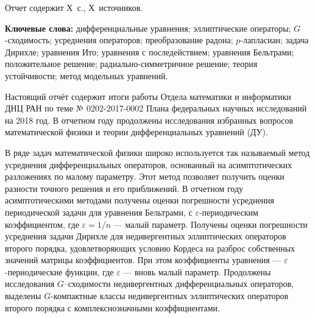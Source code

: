 \Referat %

Отчет содержит Х~с., Х~источников.%

\bigskip
\textbf{ Ключевые
	слова:}
дифференциальные уравнения;
эллиптические операторы;
$G$-сходи\-мость; %
усреднения операторов;
преобразование радона;
$p$-лапласиан;
задача Дирихле;
уравнения Ито;
уравнения с последействием;
уравнения Бельтрами;
положительное решение;
радиально-симметричное решение;
теория устойчивости;
метод модельных уравнений.


\bigskip



Настоящий отчёт содержит итоги работы Отдела математики и информатики ДНЦ РАН по теме № 0202-2017-0002  Плана федеральных научных исследований на 2018 год. 
В отчетном году продолжены исследования избранных вопросов математической физики и теории дифференциальных уравнений (ДУ).

В ряде задач математической физики широко используется так называемый метод усреднения дифференциальных операторов, основанный на асимптотических разложениях по малому параметру. Этот метод позволяет получить оценки разности точного решения и его приближений.
В отчетном году асимптотическими методами получены оценки погрешности усреднения периодической задачи для уравнения Бельтрами, с $\varepsilon$-периодическим коэффициентом, где $\varepsilon=1/n$  --- малый параметр.
Получены оценки погрешности усреднения задачи Дирихле для недивергентных эллиптических операторов второго порядка, удовлетворяющих условию Кордеса на разброс собственных значений матрицы коэффициентов. При этом коэффициенты уравнения --- $\varepsilon$-периодические функции, где $\varepsilon$ --- вновь малый параметр.
Продолжены исследования  $G$--сходимости недивергентных дифференциальных операторов, выделены $G$-компактные классы недивергентных эллиптических операторов второго порядка с комплекснозначными коэффициентами.









